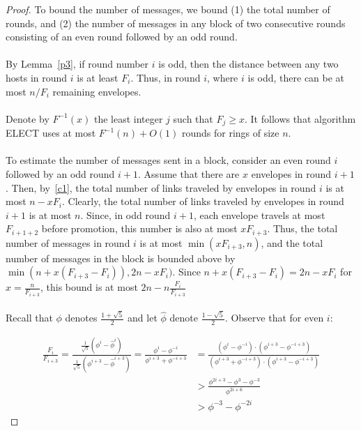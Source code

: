 \documentclass{article}
\begin{document}
\begin{proof}
    To bound the number of messages, we bound (1) the total number of rounds, and (2) the number of messages in any block of two consecutive rounds consisting of an even round followed by an odd round.
    \\\\
    By Lemma~\ref{p3}, if round number $i$ is odd, then the distance between any two hosts in round $i$ is at least $F_i$. Thus, in round $i$, where $i$ is odd, there can be at most $n/F_i$ remaining envelopes.
    \\\\
    Denote by $F^{-1}(x)$ the least integer $j$ such that $F_j \geq x$. It follows that algorithm ELECT uses at most $F^{-1}(n) + O(1)$ rounds for rings of size $n$.
    \\\\
    To estimate the number of messages sent in a block, consider an even round $i$ followed by an odd round $i+1$. Assume that there are $x$ envelopes in round $i+1$. Then, by~\cref{c1}, the total number of links traveled by envelopes in round $i$ is at most $n - xF_i$. Clearly, the total number of links traveled by envelopes in round $i+1$ is at most $n$. Since, in odd round $i+1$, each envelope travels at most $F_{i+1+2}$ before promotion, this number is also at most $xF_{i+3}$. Thus, the total number of messages in round $i$ is at most $\min(xF_{i+3}, n)$, and the total number of messages in the block is bounded above by $\min(n + x(F_{i+3} - F_i)), 2n-xF_i)$. Since $n + x(F_{i+3} - F_i) = 2n - xF_i$ for $x = \frac{n}{F_{i+3}}$, this bound is at most $2n-n\frac{F_i}{F_{i+3}}$  
    \\\\
    Recall that $\phi$ denotes $\frac{1+\sqrt{5}}{2}$ and let $\hat{\phi}$ denote $\frac{1 - \sqrt{5}}{2}$. Observe that for even $i$:

    \[
    \begin{aligned}
                \frac{F_i}{F_{i+3}} = 
        \frac{ \frac{1}{\sqrt{5}}(\phi^i - \hat{\phi}^i)}{\frac{1}{\sqrt{5}} (\phi^{i+3} - \hat{\phi}^{i+3})} = \frac{\phi^i - \phi^{-i}}{\phi^{i+3} + \phi^{-i+3}}
        & = \frac{(\phi^i - \phi^{-i}) \cdot (\phi^{i+3} - \phi^{-i+3})}{(\phi^{i+3} + \phi^{-i+3}) \cdot (\phi^{i+3} - \phi^{-i+3}) } \\
        & > \frac{\phi^{2i+3} - \phi^3 - \phi^{-3}}{\phi^{2i+6}} \\
        & > \phi^{-3} - \phi^{-2i}
    \end{aligned}
    \]


\end{proof}
\end{document}
